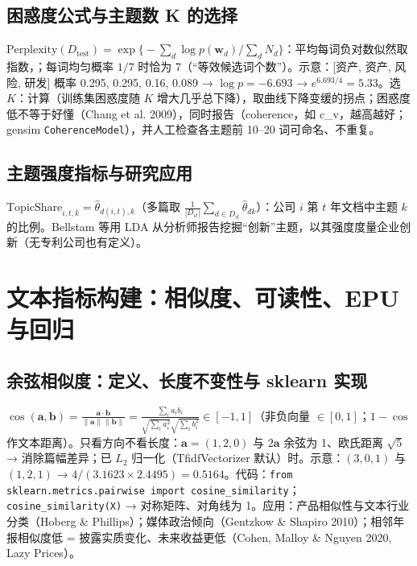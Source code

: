 \subsection{困惑度公式与主题数 K 的选择}
$\mathrm{Perplexity}(D_{\text{test}})=\exp\bigl\{-\sum_d\log p(\bm w_d)\big/\sum_dN_d\bigr\}$：平均每词负对数似然取指数，；每词均匀概率 $1/7$ 时恰为 7（“等效候选词个数”）。示意：[资产, 资产, 风险, 研发] 概率 0.295, 0.295, 0.16, 0.089 → $\log p=-6.693$ → $e^{6.693/4}=5.33$。选 $K$：计算（训练集困惑度随 $K$ 增大几乎总下降），取曲线下降变缓的拐点；困惑度低不等于好懂（Chang et al. 2009），同时报告（coherence，如 c\_v，越高越好；gensim \texttt{CoherenceModel}），并人工检查各主题前 10–20 词可命名、不重复。

\subsection{主题强度指标与研究应用}
$\text{TopicShare}_{i,t,k}=\hat\theta_{d(i,t),k}$（多篇取 $\frac{1}{|D_{it}|}\sum_{d\in D_{it}}\hat\theta_{dk}$）：公司 $i$ 第 $t$ 年文档中主题 $k$ 的比例。Bellstam 等用 LDA 从分析师报告挖掘“创新”主题，以其强度度量企业创新（无专利公司也有定义）。

\section{文本指标构建：相似度、可读性、EPU 与回归 \texorpdfstring{\tagext}{（拓展）}}

\subsection{余弦相似度：定义、长度不变性与 sklearn 实现}
$\cos(\bm a,\bm b)=\frac{\bm a\cdot\bm b}{\lVert\bm a\rVert\lVert\bm b\rVert}=\frac{\sum_ia_ib_i}{\sqrt{\sum_ia_i^2}\sqrt{\sum_ib_i^2}}\in[-1,1]$（非负向量 $\in[0,1]$；$1-\cos$ 作文本距离）。只看方向不看长度：$\bm a=(1,2,0)$ 与 $2\bm a$ 余弦为 1、欧氏距离 $\sqrt5$ → 消除篇幅差异；已 $L_2$ 归一化（TfidfVectorizer 默认）时。示意：$(3,0,1)$ 与 $(1,2,1)$ → $4/(3.1623\times2.4495)=0.5164$。代码：\lstinline|from sklearn.metrics.pairwise import cosine_similarity|；\lstinline|cosine_similarity(X)| → 对称矩阵、对角线为 1。应用：产品相似性与文本行业分类（Hoberg \& Phillips）；媒体政治倾向（Gentzkow \& Shapiro 2010）；相邻年报相似度低 = 披露实质变化、未来收益更低（Cohen, Malloy \& Nguyen 2020, Lazy Prices）。

